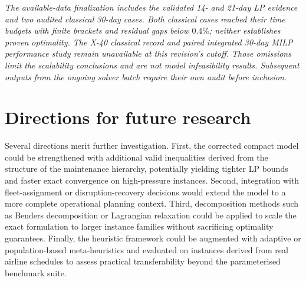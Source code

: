 \textit{The available-data finalization includes the validated 14- and 21-day
LP evidence and two audited classical 30-day cases. Both classical cases
reached their time budgets with finite brackets and residual gaps below $0.4\%$;
neither establishes proven optimality. The X-40 classical record and paired
integrated 30-day MILP performance study remain unavailable at this revision's
cutoff. Those omissions limit the scalability conclusions and are not model
infeasibility results. Subsequent outputs from the ongoing solver batch require
their own audit before inclusion.}

\section*{Directions for future research}

Several directions merit further investigation. First, the corrected compact model could be strengthened with additional valid inequalities derived from the structure of the maintenance hierarchy, potentially yielding tighter LP bounds and faster exact convergence on high-pressure instances. Second, integration with fleet-assignment or disruption-recovery decisions would extend the model to a more complete operational planning context. Third, decomposition methods such as Benders decomposition or Lagrangian relaxation could be applied to scale the exact formulation to larger instance families without sacrificing optimality guarantees. Finally, the heuristic framework could be augmented with adaptive or population-based meta-heuristics and evaluated on instances derived from real airline schedules to assess practical transferability beyond the parameterised benchmark suite.
